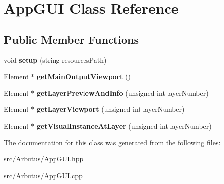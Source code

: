 \hypertarget{class_app_g_u_i}{}\section{App\+G\+UI Class Reference}
\label{class_app_g_u_i}
\subsection*{Public Member Functions}
\begin{DoxyCompactItemize}
\item 
\mbox{\label{class_app_g_u_i_a99335b7a84b20086736ae186fa27baa8}} 
void {\bfseries setup} (string resources\+Path)
\item 
\mbox{\label{class_app_g_u_i_abf7a3105a2391c3a075a79d8876fadb1}} 
Element $\ast$ {\bfseries get\+Main\+Output\+Viewport} ()
\item 
\mbox{\label{class_app_g_u_i_a84734dc3dcfec0f390c538b6cd092e45}} 
Element $\ast$ {\bfseries get\+Layer\+Preview\+And\+Info} (unsigned int layer\+Number)
\item 
\mbox{\label{class_app_g_u_i_a260cf32da70bde9ea8e3d4375db41930}} 
Element $\ast$ {\bfseries get\+Layer\+Viewport} (unsigned int layer\+Number)
\item 
\mbox{\label{class_app_g_u_i_ad95d80ea59eea6ea82680015effffbab}} 
Element $\ast$ {\bfseries get\+Visual\+Instance\+At\+Layer} (unsigned int layer\+Number)
\end{DoxyCompactItemize}


The documentation for this class was generated from the following files\+:\begin{DoxyCompactItemize}
\item 
src/\+Arbutus/App\+G\+U\+I.\+hpp\item 
src/\+Arbutus/App\+G\+U\+I.\+cpp\end{DoxyCompactItemize}
